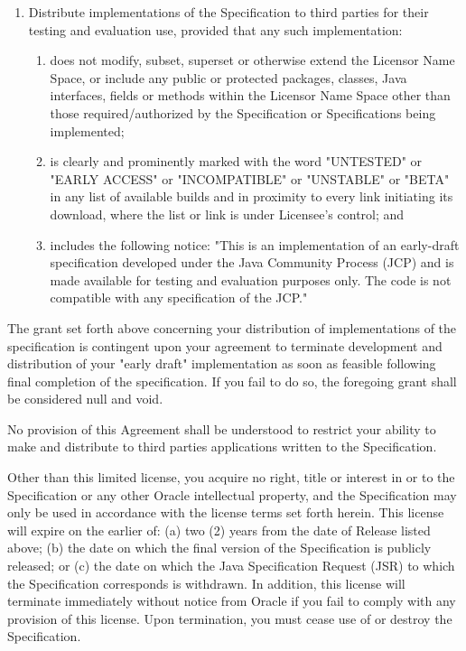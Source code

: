 \begin{flushleft}
\begin{enumerate}
\item Distribute implementations of the Specification to third parties for their testing and evaluation use, provided that any such implementation:
\begin{enumerate}
\item does not modify, subset, superset or otherwise extend the Licensor Name Space, or include any public or protected packages, classes, Java interfaces, fields or methods within the Licensor Name Space other than those required/authorized by the Specification or Specifications being implemented;
\item is clearly and prominently marked with the word "UNTESTED" or "EARLY ACCESS" or "INCOMPATIBLE" or "UNSTABLE" or "BETA" in any list of available builds and in proximity to every link initiating its download, where the list or link is under Licensee's control; and
\item includes the following notice:
"This is an implementation of an early-draft specification developed under the Java Community Process (JCP) and is made available for testing and evaluation purposes only. The code is not compatible with any specification of the JCP."
\end{enumerate}
\end{enumerate}

The grant set forth above concerning your distribution of implementations of the specification is contingent upon your agreement to terminate development and distribution of your "early draft" implementation as soon as feasible following final completion of the specification. If you fail to do so, the foregoing grant shall be considered null and void. 

No provision of this Agreement shall be understood to restrict your ability to make and distribute to third parties applications written to the Specification.

Other than this limited license, you acquire no right, title or interest in or to the Specification or any other Oracle intellectual property, and the Specification may only be used in accordance with the license terms set forth herein. This license will expire on the earlier of: (a) two (2) years from the date of Release listed above; (b) the date on which the final version of the Specification is publicly released; or (c) the date on which the Java Specification Request (JSR) to which the Specification corresponds is withdrawn. In addition, this license will terminate immediately without notice from Oracle if you fail to comply with any provision of this license. Upon termination, you must cease use of or destroy the Specification.


\end{flushleft}

